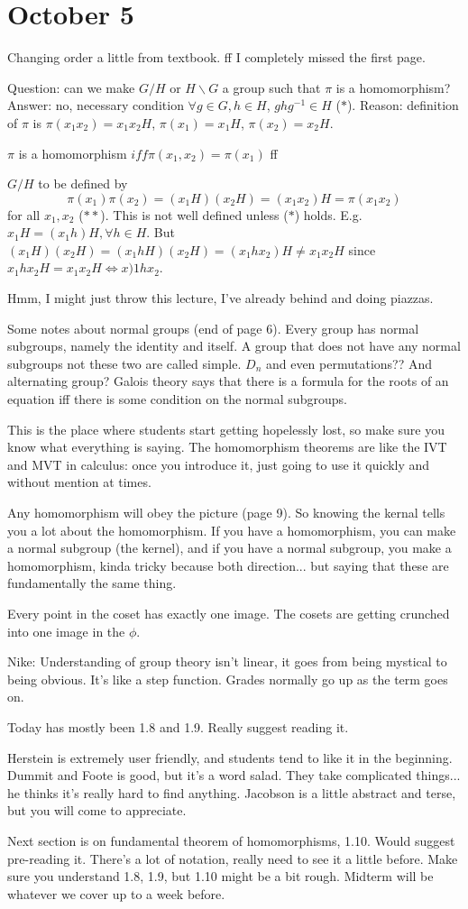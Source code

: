 \documentclass{article}
\theoremstyle{plain}
\theoremstyle{remark}
\begin{document}
\section{October 5}
Changing order a little from textbook.
ff I completely missed the first page.

Question: can we make $G / H$ or $H \backslash G$ a group
such that $\pi$ is a homomorphism?
Answer: no, necessary condition $\forall g \in G, h \in H$, $ghg^{-1} \in H$ ($*$).
Reason: definition of $\pi$ is $\pi(x_1x_2) = x_1x_2H$, $\pi(x_1)=x_1H$, $\pi(x_2) = x_2H$.

$\pi$ is a homomorphism $iff \pi(x_1,x_2) = \pi(x_1)$ ff

$G/H$ to be defined by
\[
	\pi(x_1)\pi(x_2) = (x_1H)(x_2H) = (x_1x_2)H = \pi(x_1x_2)
\]
for all $x_1,x_2$ ($**$).
This is not well defined unless ($*$) holds.
E.g. $x_1 H = (x_1h)H, \forall h \in H$.
But $(x_1 H)(x_2 H) = (x_1hH) (x_2H) = (x_1hx_2)H \neq x_1x_2H$
since $x_1hx_2H = x_1 x_2 H \iff x)1 h x_2$.

Hmm, I might just throw this lecture, I've already behind and doing piazzas.

Some notes about normal groups (end of page 6).
Every group has normal subgroups, namely the identity and itself.
A group that does not have any normal subgroups not these two are called simple.
$D_n$ and even permutations?? And alternating group?
Galois theory says that there is a formula for the roots of an equation
iff there is some condition on the normal subgroups.

This is the place where students start getting hopelessly lost,
so make sure you know what everything is saying.
The homomorphism theorems are like the IVT and MVT in calculus:
once you introduce it, just going to use it quickly and without mention at times.

Any homomorphism will obey the picture (page 9).
So knowing the kernal tells you a lot about the homomorphism.
If you have a homomorphism, you can make a normal subgroup (the kernel),
and if you have a normal subgroup, you make a homomorphism,
kinda tricky because both direction... but saying that these are fundamentally the same thing.

Every point in the coset has exactly one image.
The cosets are getting crunched into one image in the $\phi$.

Nike: Understanding of group theory isn't linear,
it goes from being mystical to being obvious.
It's like a step function.
Grades normally go up as the term goes on.


Today has mostly been 1.8 and 1.9.
Really suggest reading it.

Herstein is extremely user friendly, and students tend to like it in the beginning.
Dummit and Foote is good, but it's a word salad.
They take complicated things... he thinks it's really hard to find anything.
Jacobson is a little abstract and terse, but you will come to appreciate.

Next section is on fundamental theorem of homomorphisms, 1.10.
Would suggest pre-reading it.
There's a lot of notation, really need to see it a little before.
Make sure you understand 1.8, 1.9, but 1.10 might be a bit rough.
Midterm will be whatever we cover up to a week before.
\end{document}
